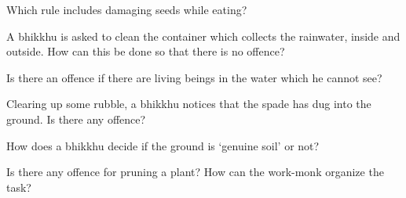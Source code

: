 \begin{exam}{\autoExamName}
\bigskip

Which rule includes damaging seeds while eating?

\bigskip

A bhikkhu is asked to clean the container which collects the rainwater, inside and outside.
How can this be done so that there is no offence?

\bigskip

Is there an offence if there are living beings in the water which he cannot see?

\bigskip

Clearing up some rubble, a bhikkhu notices that the spade has dug into the ground. Is there any offence?

\bigskip

How does a bhikkhu decide if the ground is `genuine soil' or not?

\bigskip

Is there any offence for pruning a plant? How can the work-monk organize the task?

\end{exam}

